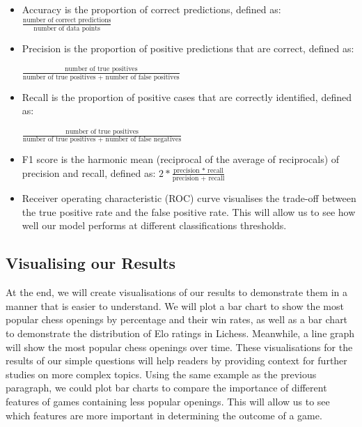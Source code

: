 \documentclass[%
 superscriptaddress,
showpacs,preprintnumbers,
 amsmath,
 amssymb,
 aps,
 pra,
showkeys,
onecolumn,
notitlepage,
11pt,
tightenlines      %
]{revtex4-1}
\begin{document}
\begin{itemize}
    \item Accuracy is the proportion of correct predictions, defined as: $\frac{\text{number of correct predictions}}{\text{number of data points}}$
    \item Precision is the proportion of positive predictions that are correct, defined as:
    
    $\frac{\text{number of true positives}}{\text{number of true positives + number of false positives}}$
    \item Recall is the proportion of positive cases that are correctly identified, defined as:
    
    $\frac{\text{number of true positives}}{\text{number of true positives + number of false negatives}}$
    \item F1 score is the harmonic mean (reciprocal of the average of reciprocals) of precision and recall, defined as: $2 * \frac{\text{precision * recall}}{\text{precision + recall}}$
    \item Receiver operating characteristic (ROC) curve visualises the trade-off between the true positive rate and the false positive rate. This will allow us to see how well our model performs at different classifications thresholds.
\end{itemize}

\subsection{Visualising our Results}
At the end, we will create visualisations of our results to demonstrate them in a manner that is easier to understand. We will plot a bar chart to show the most popular chess openings by percentage and their win rates, as well as a bar chart to demonstrate the distribution of Elo ratings in Lichess. Meanwhile, a line graph will show the most popular chess openings over time. These visualisations for the results of our simple questions will help readers by providing context for further studies on more complex topics. Using the same example as the previous paragraph, we could plot bar charts to compare the importance of different features of games containing less popular openings. This will allow us to see which features are more important in determining the outcome of a game.
\end{document}
